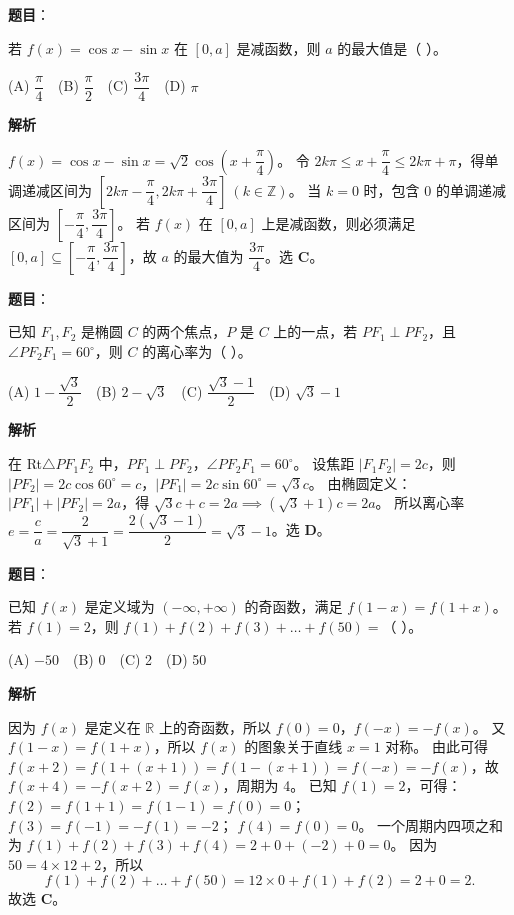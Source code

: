 \begin{answer}

\textbf{题目}：

若 $f(x)=\cos x-\sin x$ 在 $[0,a]$ 是减函数，则 $a$ 的最大值是（ ）。

(A) $\dfrac\pi4$　(B) $\dfrac\pi2$　(C) $\dfrac{3\pi}{4}$　(D) $\pi$

\textbf{解析}

$f(x) = \cos x - \sin x = \sqrt2\cos\left(x+\dfrac\pi4\right)$。
令 $2k\pi \leqslant x+\dfrac\pi4 \leqslant 2k\pi+\pi$，得单调递减区间为 $\left[2k\pi-\dfrac\pi4, 2k\pi+\dfrac{3\pi}{4}\right]\ (k\in\mathbb Z)$。
当 $k=0$ 时，包含 0 的单调递减区间为 $\left[-\dfrac\pi4, \dfrac{3\pi}{4}\right]$。
若 $f(x)$ 在 $[0,a]$ 上是减函数，则必须满足 $[0,a]\subseteq \left[-\dfrac\pi4, \dfrac{3\pi}{4}\right]$，故 $a$ 的最大值为 $\dfrac{3\pi}{4}$。选 \textbf{C}。


\end{answer}
\begin{answer}

\textbf{题目}：

已知 $F_1,F_2$ 是椭圆 $C$ 的两个焦点，$P$ 是 $C$ 上的一点，若 $PF_1\perp PF_2$，且 $\angle PF_2F_1=60^\circ$，则 $C$ 的离心率为（ ）。

(A) $1-\dfrac{\sqrt3}{2}$　(B) $2-\sqrt3$　(C) $\dfrac{\sqrt3-1}{2}$　(D) $\sqrt3-1$

\textbf{解析}

在 Rt$\triangle PF_1F_2$ 中，$PF_1\perp PF_2$，$\angle PF_2F_1 = 60^\circ$。
设焦距 $|F_1F_2| = 2c$，则 $|PF_2| = 2c\cos 60^\circ = c$，$|PF_1| = 2c\sin 60^\circ = \sqrt3 c$。
由椭圆定义：$|PF_1|+|PF_2| = 2a$，得 $\sqrt3 c + c = 2a \implies (\sqrt3+1)c = 2a$。
所以离心率 $e = \dfrac ca = \dfrac{2}{\sqrt3+1} = \dfrac{2(\sqrt3-1)}{2} = \sqrt3-1$。选 \textbf{D}。


\end{answer}
\begin{answer}

\textbf{题目}：

已知 $f(x)$ 是定义域为 $(-\infty,+\infty)$ 的奇函数，满足 $f(1-x)=f(1+x)$。若 $f(1)=2$，则 $f(1)+f(2)+f(3)+\dots+f(50)=$（ ）。

(A) $-50$　(B) 0　(C) 2　(D) 50

\textbf{解析}

因为 $f(x)$ 是定义在 $\mathbb R$ 上的奇函数，所以 $f(0)=0$，$f(-x)=-f(x)$。
又 $f(1-x)=f(1+x)$，所以 $f(x)$ 的图象关于直线 $x=1$ 对称。
由此可得 $f(x+2) = f(1+(x+1)) = f(1-(x+1)) = f(-x) = -f(x)$，故 $f(x+4) = -f(x+2) = f(x)$，周期为 4。
已知 $f(1)=2$，可得：
$f(2) = f(1+1) = f(1-1) = f(0) = 0$；
$f(3) = f(-1) = -f(1) = -2$；
$f(4) = f(0) = 0$。
一个周期内四项之和为 $f(1)+f(2)+f(3)+f(4) = 2+0+(-2)+0 = 0$。
因为 $50 = 4\times 12 + 2$，所以
\nopagebreak[4]
\[f(1)+f(2)+\dots+f(50) = 12\times 0 + f(1) + f(2) = 2+0 = 2.\]
故选 \textbf{C}。


\end{answer}
